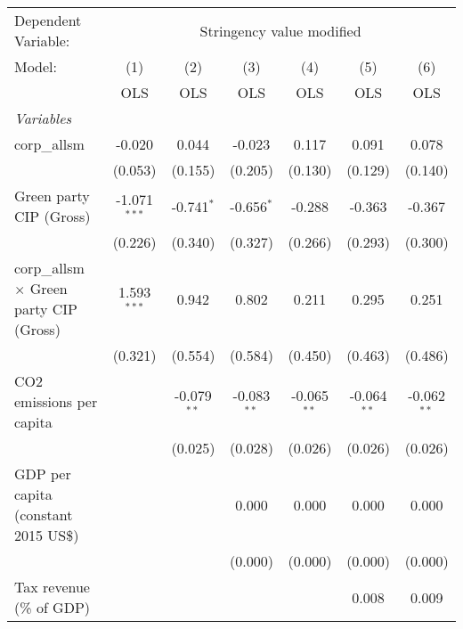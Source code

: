 
\begingroup
\centering
\begin{tabular}{lcccccc}
   \toprule
   Dependent Variable: & \multicolumn{6}{c}{Stringency value modified}\\
   Model:                                         & (1)            & (2)           & (3)           & (4)           & (5)           & (6)\\  
                                                  &  OLS           & OLS           & OLS           & OLS           & OLS           & OLS\\  
   \midrule
   \emph{Variables}\\
   corp\_allsm                                    & -0.020         & 0.044         & -0.023        & 0.117         & 0.091         & 0.078\\   
                                                  & (0.053)        & (0.155)       & (0.205)       & (0.130)       & (0.129)       & (0.140)\\   
   Green party CIP (Gross)                        & -1.071$^{***}$ & -0.741$^{*}$  & -0.656$^{*}$  & -0.288        & -0.363        & -0.367\\   
                                                  & (0.226)        & (0.340)       & (0.327)       & (0.266)       & (0.293)       & (0.300)\\   
   corp\_allsm $\times$ Green party CIP (Gross)   & 1.593$^{***}$  & 0.942         & 0.802         & 0.211         & 0.295         & 0.251\\   
                                                  & (0.321)        & (0.554)       & (0.584)       & (0.450)       & (0.463)       & (0.486)\\   
   CO2 emissions per capita                       &                & -0.079$^{**}$ & -0.083$^{**}$ & -0.065$^{**}$ & -0.064$^{**}$ & -0.062$^{**}$\\   
                                                  &                & (0.025)       & (0.028)       & (0.026)       & (0.026)       & (0.026)\\   
   GDP per capita (constant 2015 US\$)            &                &               & 0.000         & 0.000         & 0.000         & 0.000\\   
                                                  &                &               & (0.000)       & (0.000)       & (0.000)       & (0.000)\\   
   Tax revenue (\% of GDP)                        &                &               &               &               & 0.008         & 0.009\\   

\end{tabular}

